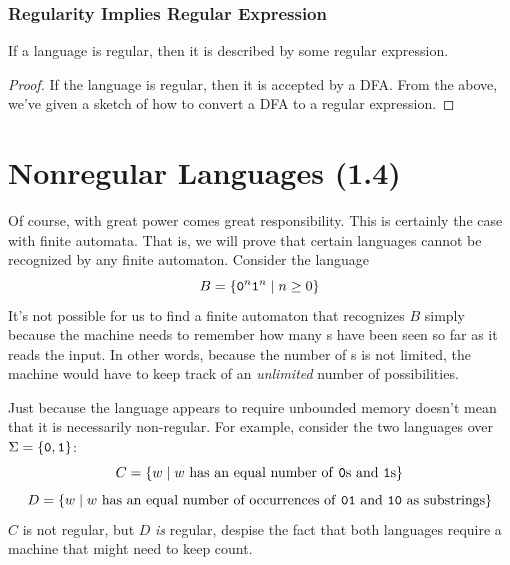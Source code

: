 \documentclass[letterpaper]{article}
\begin{document}
\subsubsection{Regularity Implies Regular Expression}

\begin{lemma}{}{}
    If a language is regular, then it is described by some regular expression.
\end{lemma}

\begin{mdframed}[]
    \begin{proof}
        If the language is regular, then it is accepted by a DFA. From the above, we've given a sketch of how to convert a DFA to a regular expression. 
    \end{proof}
\end{mdframed}















\newpage 
\section{Nonregular Languages (1.4)}
Of course, with great power comes great responsibility. This is certainly the case with finite automata. That is, we will prove that certain languages cannot be recognized by any finite automaton. Consider the language
\[B = \{\texttt{0}^n \texttt{1}^n \mid n \geq 0\}\]
It's not possible for us to find a finite automaton that recognizes $B$ simply because the machine needs to remember how many s have been seen so far as it reads the input. In other words, because the number of s is not limited, the machine would have to keep track of an \emph{unlimited} number of possibilities.

\begin{note}{}{}
    Just because the language appears to require unbounded memory doesn't mean that it is necessarily non-regular. For example, consider the two languages over $\Sigma = \{\texttt{0}, \texttt{1}\}$: 
    \[C = \{w \mid w \text{ has an equal number of \texttt{0}s and \texttt{1}s}\}\]
    \[D = \{w \mid w \text{ has an equal number of occurrences of \texttt{01} and \texttt{10} as substrings}\}\]
    $C$ is not regular, but $D$ \emph{is} regular, despise the fact that both languages require a machine that might need to keep count. 
\end{note}
\end{document}
